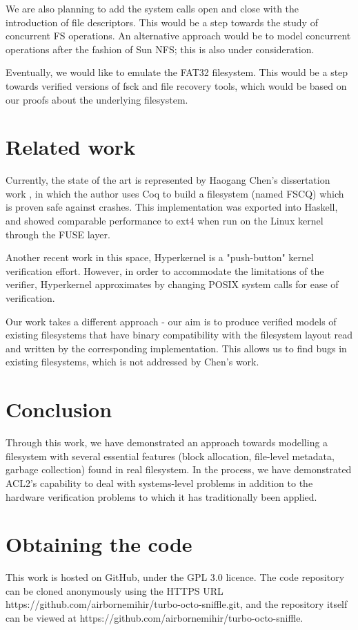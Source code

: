 \documentclass[format=sigconf,review=true]{acmart}
\begin{document}
We are also planning to add the system calls open and close with the
introduction of file descriptors. This would be a step towards the
study of concurrent FS operations. An alternative approach would be to
model concurrent operations after the fashion of Sun NFS; this is also
under consideration.

Eventually, we would like to emulate the FAT32 filesystem. This would
be a step towards verified versions of fsck and file recovery tools,
which would be based on our proofs about the underlying filesystem.

\section{Related work}
Currently, the state of the art is represented by Haogang
Chen's dissertation work \cite{DBLP:conf/usenix/ChenZCCKZ16}, in which
the author uses Coq to build a filesystem (named FSCQ) which is proven
safe against crashes. This implementation was exported into Haskell,
and showed comparable performance to ext4 when run on the Linux kernel
through the FUSE layer.

Another recent work in this space, Hyperkernel
\cite{Nelson:2017:HPV:3132747.3132748} is a "push-button" kernel verification
effort. However, in order to accommodate the limitations of the
verifier, Hyperkernel approximates by changing POSIX system calls for
ease of verification.

Our work takes a different approach - our aim is to produce verified
models of existing filesystems that have binary compatibility with the
filesystem layout read and written by the corresponding
implementation. This allows us to find bugs in existing filesystems,
which is not addressed by Chen's work.

\section{Conclusion}
Through this work, we have demonstrated an approach towards modelling
a filesystem with several essential features (block allocation,
file-level metadata, garbage collection) found in real filesystem. In
the process, we have demonstrated ACL2's capability to deal with
systems-level problems in addition to the hardware verification
problems to which it has traditionally been applied.

\section{Obtaining the code}
This work is hosted on GitHub, under the GPL 3.0 licence. The code
repository can be cloned anonymously using the HTTPS URL
https://github.com/airbornemihir/turbo-octo-sniffle.git, and the
repository itself can be viewed at
https://github.com/airbornemihir/turbo-octo-sniffle.



\end{document}
